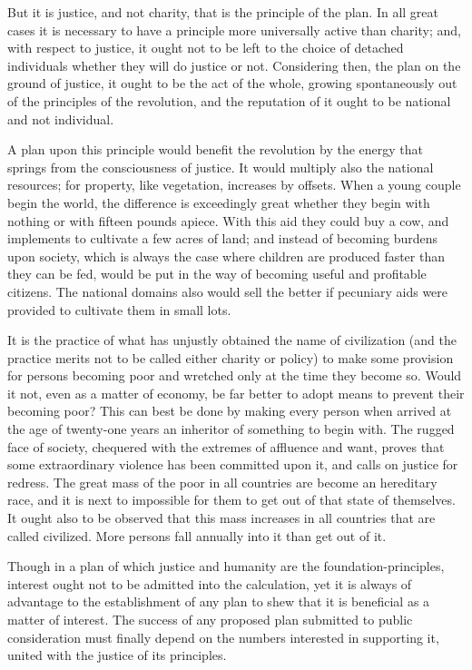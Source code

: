But it is justice, and not charity, that is the principle of the plan. In all great cases it is necessary to have a principle more universally active than charity; and, with respect to justice, it ought not to be left to the choice of detached individuals whether they will do justice or not. Considering then, the plan on the ground of justice, it ought to be the act of the whole, growing spontaneously out of the principles of the revolution, and the reputation of it ought to be national and not individual.\par

A plan upon this principle would benefit the revolution by the energy that springs from the consciousness of justice. It would multiply also the national resources; for property, like vegetation, increases by offsets. When a young couple begin the world, the difference is exceedingly great whether they begin with nothing or with fifteen pounds apiece. With this aid they could buy a cow, and implements to cultivate a few acres of land; and instead of becoming burdens upon society, which is always the case where children are produced faster than they can be fed, would be put in the way of becoming useful and profitable citizens. The national domains also would sell the better if pecuniary aids were provided to cultivate them in small lots.\par

It is the practice of what has unjustly obtained the name of civilization (and the practice merits not to be called either charity or policy) to make some provision for persons becoming poor and wretched only at the time they become so. Would it not, even as a matter of economy, be far better to adopt means to prevent their becoming poor? This can best be done by making every person when arrived at the age of twenty-one years an inheritor of something to begin with. The rugged face of society, chequered with the extremes of affluence and want, proves that some extraordinary violence has been committed upon it, and calls on justice for redress. The great mass of the poor in all countries are become an hereditary race, and it is next to impossible for them to get out of that state of themselves. It ought also to be observed that this mass increases in all countries that are called civilized. More persons fall annually into it than get out of it.\par

Though in a plan of which justice and humanity are the foundation-principles, interest ought not to be admitted into the calculation, yet it is always of advantage to the establishment of any plan to shew that it is beneficial as a matter of interest. The success of any proposed plan submitted to public consideration must finally depend on the numbers interested in supporting it, united with the justice of its principles.\par

